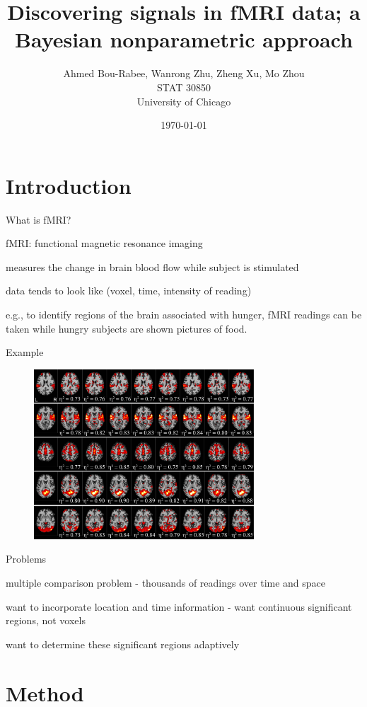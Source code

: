\documentclass[10pt,mathserif]{beamer}
\title{\large \bfseries Discovering signals in fMRI data; 
a Bayesian nonparametric approach }
\author{Ahmed Bou-Rabee, Wanrong Zhu, Zheng Xu, Mo Zhou\\[3ex]
STAT 30850\\
University of Chicago}
\date{\today}
\begin{document}
\frame{
\thispagestyle{empty}
\titlepage
}

\section{Introduction}

\begin{frame} {What is fMRI?}
\BIT
\item  fMRI: functional magnetic resonance imaging 
\item  measures the change in brain blood flow while subject is stimulated
\item  data tends to look like (voxel, time, intensity of reading)
\item  e.g., to identify regions of the brain associated with hunger, fMRI readings can be taken while hungry subjects are shown pictures of food.
\EIT
\end{frame}

\begin{frame} {Example}
\begin{figure}
\centering
  \includegraphics[width=\linewidth, height = 2.5in]{../DSC-H0217_03}
  \end{figure}
\end{frame}


\begin{frame} {Problems} 
\BIT
\item  multiple comparison problem - thousands of readings over time and space 
\item want to incorporate location and time information - want continuous significant regions, not voxels
\item want to determine these significant regions adaptively
\EIT
\end{frame}

\section{Method } 
\end{document}
